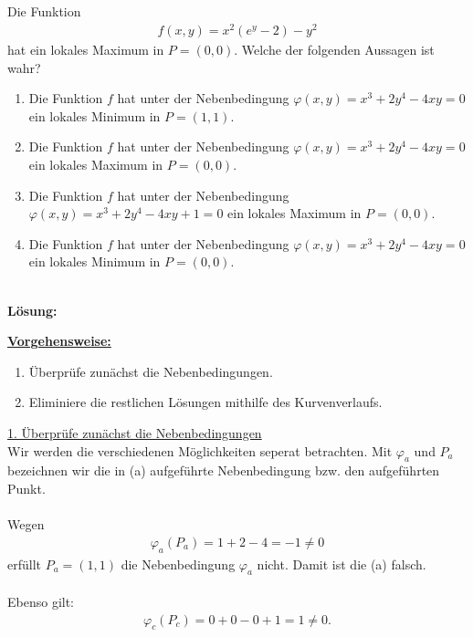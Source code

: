 \subsection*{}
Die Funktion
\begin{align*}
f(x,y) =x^2 (e^y -2) -y^2
\end{align*}
hat ein lokales Maximum in $ P = (0,0) $. Welche der folgenden Aussagen ist wahr?
\renewcommand{\labelenumi}{(\alph{enumi})}
\begin{enumerate}
	\item Die Funktion $ f $ hat unter der Nebenbedingung $ \varphi(x,y)  = x^3 + 2y^4 - 4xy = 0$ ein lokales Minimum in $ P = (1,1) $.
	\item Die Funktion $ f $ hat unter der Nebenbedingung $ \varphi(x,y)  = x^3 + 2y^4 - 4xy = 0$ ein lokales Maximum in $ P = (0,0) $.
	\item Die Funktion $ f $ hat unter der Nebenbedingung $ \varphi(x,y)  = x^3 + 2y^4 - 4xy + 1 = 0$ ein lokales Maximum in $ P = (0,0) $.
	\item Die Funktion $ f $ hat unter der Nebenbedingung $ \varphi(x,y)  = x^3 + 2y^4 - 4xy = 0$ ein lokales Minimum in $ P = (0,0) $.
\end{enumerate}
\ \\
\textbf{Lösung:}
\begin{mdframed}
	\underline{\textbf{Vorgehensweise:}}
	\renewcommand{\labelenumi}{\theenumi.}
	\begin{enumerate}
		\item Überprüfe zunächst die Nebenbedingungen.
		\item Eliminiere die restlichen Lösungen mithilfe des Kurvenverlaufs.
	\end{enumerate}
\end{mdframed}
\underline{1. Überprüfe zunächst die Nebenbedingungen}\\
Wir werden die verschiedenen Möglichkeiten seperat betrachten.
Mit $ \varphi_a $ und $ P_a $ bezeichnen wir die in (a) aufgeführte Nebenbedingung  bzw. den aufgeführten Punkt.\\
\\
Wegen 
\begin{align*}
\varphi_a(P_a) = 1 + 2 - 4  = -1 \neq 0
\end{align*}
erfüllt $ P_a = (1,1) $ die Nebenbedingung $ \varphi_a $ nicht.
Damit ist die (a) falsch.\\
\\
Ebenso gilt:
\begin{align*}
\varphi_c(P_c) = 0 + 0 - 0 + 1 = 1 \neq  0.
\end{align*}
